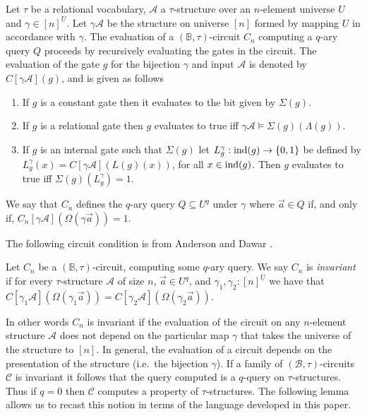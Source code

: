 \documentclass[../paper.tex]{subfiles}
\begin{document}
Let $\tau$ be a relational vocabulary, $\mathcal{A}$ a $\tau$-structure over an
$n$-element universe $U$ and $\gamma \in [n]^{\underline{U}}$. Let $\gamma
\mathcal{A}$ be the structure on universe $[n]$ formed by mapping $U$ in
accordance with $\gamma$. The evaluation of a $(\mathbb{B}, \tau)$-circuit $C_n$
computing a $q$-ary query $Q$ proceeds by recursively evaluating the gates in
the circuit. The evaluation of the gate $g$ for the bijection $\gamma$ and input
$\mathcal{A}$ is denoted by $C[\gamma \mathcal{A}](g)$, and is given as follows
\begin{enumerate}
  \setlength\itemsep{0mm}
\item If $g$ is a constant gate then it evaluates to the bit given by
  $\Sigma(g)$.
\item If $g$ is a relational gate then $g$ evaluates to true iff $\gamma
  \mathcal{A} \models \Sigma(g)(\Lambda (g))$.
\item If $g$ is an internal gate such that $\Sigma (g)$ let $L^{\gamma}_g:
  \text{\upshape ind}(g) \rightarrow \{0,1\}$ be defined by $L^{\gamma}_g(x) = C[\gamma
  \mathcal{A}](L(g)(x))$, for all $x \in \text{\upshape ind}(g)$. Then $g$ evaluates to true
  iff $\Sigma(g) (L^{\gamma}_g) = 1$.
\end{enumerate}
We say that $C_n$ defines the $q$-ary query $Q \subseteq U^q$ under $\gamma$
where $\vec{a} \in Q$ if, and only if, $C_n[\gamma \mathcal{A}](\Omega (\gamma
\vec{a})) = 1$.


The following circuit condition is from Anderson and Dawar \cite{AndersonD17}.

\begin{definition}
  Let $C_n$ be a $(\mathbb{B}, \tau)$-circuit, computing some $q$-ary query. We
  say $C_n$ is \emph{invariant} if for every $\tau$-structure $\mathcal{A}$ of
  size $n$, $\vec{a} \in U^{q}$, and $\gamma_1, \gamma_2: [n]^{\underline{U}}$
  we have that $C[\gamma_1 \mathcal{A}](\Omega (\gamma_1 \vec{a})) = C[\gamma_2
  \mathcal{A}](\Omega (\gamma_2 \vec{a}))$.
\end{definition}

In other words $C_n$ is invariant if the evaluation of the circuit on any
$n$-element structure $\mathcal{A}$ does not depend on the particular map
$\gamma$ that takes the universe of the structure to $[n]$. In general, the
evaluation of a circuit depends on the presentation of the structure (i.e.\ the
bijection $\gamma$). If a family of $(\mathcal{B}, \tau)$-circuits $\mathcal{C}$
is invariant it follows that the query computed is a $q$-query on
$\tau$-structures. Thus if $q = 0$ then $\mathcal{C}$ computes a property of
$\tau$-structures. The following lemma allows us to recast this notion in terms
of the language developed in this paper.
\end{document}
